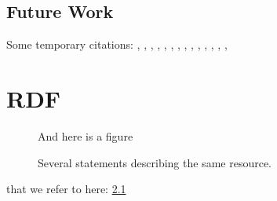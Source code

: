 \documentclass[a4paper,11pt]{kth-mag}
\begin{document}
\section{Future Work}


Some temporary citations:
\cite{hoare69}, \cite{floyd67}, \cite{pnueli77},
\cite{leucker09abriefaccount}, \cite{bauer06monitoring}, \cite{bauer08goodbadugly}, \cite{delgado04taxonomy}, \cite{meyer92applyingdbc},
\cite{rosenblum95practicalassertions}, \cite{bartetzko01jass},
\cite{bodden04lightweightltl}, \cite{bodden05efficientrv},
\cite{becksmalltalktesting}, \cite{fowlerxunit},
\cite{matusiak09aoppy}












\appendix
\addappheadtotoc
\chapter{RDF}\label{appA}

\begin{figure}[ht]
\begin{center}
And here is a figure
\caption{\small{Several statements describing the same resource.}}\label{RDF_4}
\end{center}
\end{figure}

that we refer to here: \ref{RDF_4}
\end{document}
